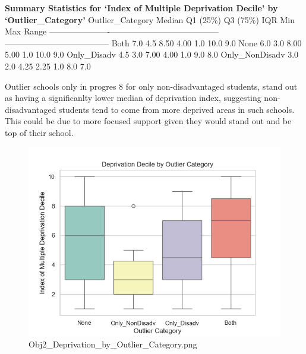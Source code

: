 \documentclass[
  letterpaper,
  DIV=11,
  numbers=noendperiod]{scrartcl}
\begin{document}
\textbf{Summary Statistics for `Index of Multiple Deprivation Decile' by
`Outlier\_Category'} \textbar{} Outlier\_Category \textbar{} Median
\textbar{} Q1 (25\%) \textbar{} Q3 (75\%) \textbar{} IQR \textbar{} Min
\textbar{} Max \textbar{} Range \textbar{}
\textbar----------------------\textbar------------\textbar--------------\textbar--------------\textbar---------\textbar---------\textbar---------\textbar-----------\textbar{}
\textbar{} Both \textbar{} 7.0 \textbar{} 4.5 \textbar{} 8.50 \textbar{}
4.00 \textbar{} 1.0 \textbar{} 10.0 \textbar{} 9.0 \textbar{} \textbar{}
None \textbar{} 6.0 \textbar{} 3.0 \textbar{} 8.00 \textbar{} 5.00
\textbar{} 1.0 \textbar{} 10.0 \textbar{} 9.0 \textbar{} \textbar{}
Only\_Disadv \textbar{} 4.5 \textbar{} 3.0 \textbar{} 7.00 \textbar{}
4.00 \textbar{} 1.0 \textbar{} 9.0 \textbar{} 8.0 \textbar{} \textbar{}
Only\_NonDisadv \textbar{} 3.0 \textbar{} 2.0 \textbar{} 4.25 \textbar{}
2.25 \textbar{} 1.0 \textbar{} 8.0 \textbar{} 7.0 \textbar{}

Outlier schools only in progres 8 for only non-disadvantaged students,
stand out as having a significanlty lower median of deprivation index,
suggesting non-disadvantaged students tend to come from more deprived
areas in such schools. This could be due to more focused support given
they would stand out and be top of their school.

\begin{figure}[H]

{\centering \includegraphics{P4DS_A2_Data_Analysis_Project_files/figure-pdf/cell-193-1-Obj2_Deprivation_by_Outlier_Category.png}

}

\caption{Obj2\_Deprivation\_by\_Outlier\_Category.png}

\end{figure}%
\end{document}
